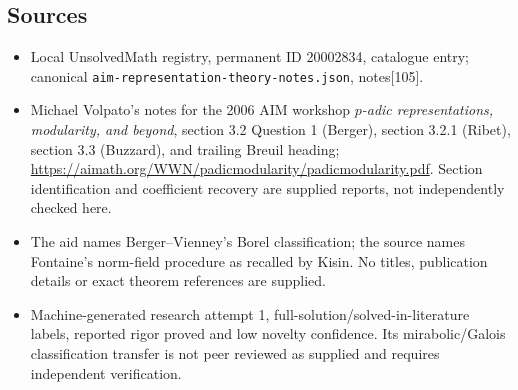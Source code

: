 \documentclass[11pt]{article}
\begin{document}
\subsection{Sources}
\begin{itemize}
\item Local UnsolvedMath registry, permanent ID 20002834, catalogue entry; canonical \texttt{aim-representation-theory-notes.json}, notes[105].
\item Michael Volpato's notes for the 2006 AIM workshop \emph{\(p\)-adic representations, modularity, and beyond}, section 3.2 Question 1 (Berger), section 3.2.1 (Ribet), section 3.3 (Buzzard), and trailing Breuil heading; \url{https://aimath.org/WWN/padicmodularity/padicmodularity.pdf}. Section identification and coefficient recovery are supplied reports, not independently checked here.
\item The aid names Berger--Vienney's Borel classification; the source names Fontaine's norm-field procedure as recalled by Kisin. No titles, publication details or exact theorem references are supplied.
\item Machine-generated research attempt 1, full-solution/solved-in-literature labels, reported rigor proved and low novelty confidence. Its mirabolic/Galois classification transfer is not peer reviewed as supplied and requires independent verification.
\end{itemize}
\end{document}
